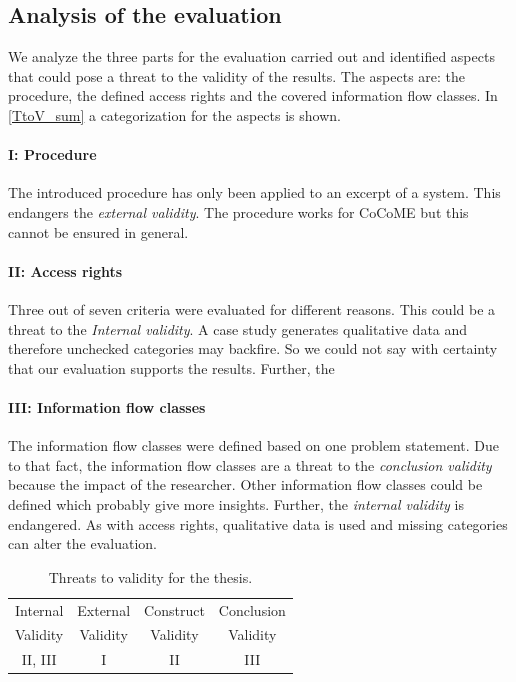\subsection{Analysis of the evaluation}
We analyze the three parts for the evaluation carried out and identified aspects that could pose a threat to the validity of the results. The aspects are: the procedure, the defined access rights and the covered information flow classes. In \autoref{TtoV_sum} a categorization for the aspects is shown.
\paragraph{I: Procedure}
The introduced procedure has only been applied to an excerpt of a system. This endangers the \textit{external validity}. The procedure works for CoCoME but this cannot be ensured in general.
\paragraph{II: Access rights}
Three out of seven criteria were evaluated for different reasons. This could be a threat to the \textit{Internal validity}. A case study generates qualitative data and therefore unchecked categories may backfire. So we could not say with certainty that our evaluation supports the results. Further, the %
\paragraph{III: Information flow classes}
The information flow classes were defined based on one problem statement. Due to that fact, the information flow classes are a threat to the \textit{conclusion validity} because the impact of the researcher. Other information flow classes could be defined which probably give more insights. Further, the \textit{internal validity} is endangered. As with access rights, qualitative data is used and missing categories can alter the evaluation.
\begin{table}
\begin{tabular}{|c|c|c|c|}
\hline 
Internal & External & Construct & Conclusion \\ 
Validity & Validity & Validity & Validity\\
\hline 
II, III & I & II & III \\ 
\hline 
\end{tabular} 
\caption{Threats to validity for the thesis.}
\label{TtoV_sum}
\end{table}